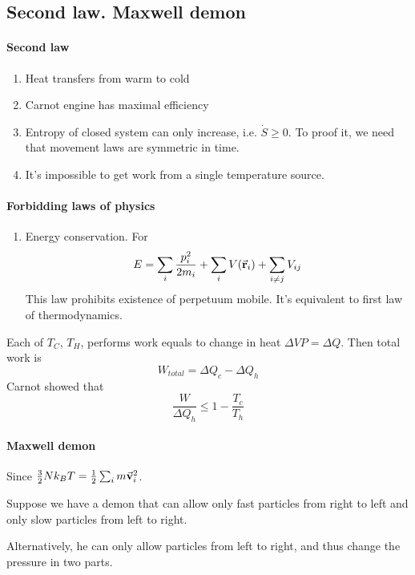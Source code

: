 \subsection{Second law. Maxwell demon}
\paragraph{Second law} 
\begin{enumerate}
	\item Heat transfers from warm to cold
	\item Carnot engine has maximal efficiency 
	\item Entropy of closed system can only increase, i.e. $\dot{S}\geq0$. To proof it, we need that movement laws are symmetric in time.
	\item It's impossible to get work from a single temperature source.
\end{enumerate}
\paragraph{Forbidding laws of physics }
\begin{enumerate}
	\item Energy conservation. For
	 $$E = \sum_i \frac{p_i^2}{2m_i}+ \sum_i V(\va{r}_i) + \sum_{i\neq j} V_{ij}$$
	 This law prohibits existence of perpetuum mobile. It's equivalent to first law of thermodynamics.
\end{enumerate}


\begin{center}	
	
\end{center}
Each of $T_C$, $T_H$, performs work equals to change in heat $\Delta VP = \Delta Q$. Then total work is 
$$W_{total} = \Delta Q_c - \Delta Q_h$$
Carnot showed that
$$\frac{W}{\Delta Q_h} \leq 1 - \frac{T_c}{T_h}$$

\paragraph{Maxwell demon}
Since $\frac{3}{2}Nk_BT = \frac{1}{2} \sum_i m\va{v}_i^2$.

\begin{center}	
	
\end{center}

Suppose we have a demon that can allow only fast particles from right to left and only slow particles from left to right. 

Alternatively, he can only allow particles from left to right, and thus change the pressure in two parts.